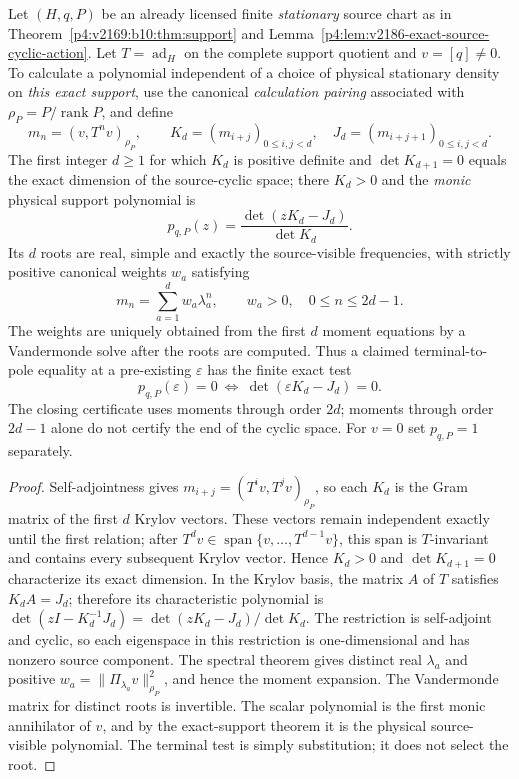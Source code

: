 \documentclass[12pt,a4paper]{article}
\begin{document}
\begin{theorem}
\label{p4:thm:v2188-moment-pencil}
Let $(H,q,P)$ be an already licensed finite \emph{stationary} source chart
as in Theorem~\ref{p4:v2169:b10:thm:support} and
Lemma~\ref{p4:lem:v2186-exact-source-cyclic-action}. Let
$T=\operatorname{ad}_H$ on the complete support quotient and
$v=[q]\ne0$. To calculate a polynomial independent of a choice of
physical stationary density on \emph{this exact support}, use the
canonical \emph{calculation pairing} associated with
$\rho_P=P/\operatorname{rank}P$, and define
\[
 m_n=(v,T^n v)_{\rho_P},\qquad
 K_d=(m_{i+j})_{0\le i,j<d},\quad
 J_d=(m_{i+j+1})_{0\le i,j<d}.
\]
The first integer $d\ge1$ for which $K_d$ is positive definite and
$\det K_{d+1}=0$ equals the exact dimension of the source-cyclic space;
there $K_d>0$ and the \emph{monic} physical support polynomial is
\[
 \boxed{p_{q,P}(z)=\frac{\det(zK_d-J_d)}{\det K_d}.}
\]
Its $d$ roots are real, simple and exactly the source-visible frequencies,
with strictly positive canonical weights $w_a$ satisfying
\[
 \boxed{m_n=\sum_{a=1}^{d} w_a\lambda_a^n,\qquad
 w_a>0,\quad 0\le n\le 2d-1.}
\]
The weights are uniquely obtained from the first $d$ moment equations
by a Vandermonde solve after the roots are computed. Thus a claimed
terminal-to-pole equality at a pre-existing $\varepsilon$ has the
finite exact test
\[
 \boxed{p_{q,P}(\varepsilon)=0
 \ \Longleftrightarrow\ \det(\varepsilon K_d-J_d)=0.}
\]
The closing certificate uses moments through order $2d$; moments
through order $2d-1$ alone do not certify the end of the cyclic space.
For $v=0$ set $p_{q,P}=1$ separately.
\end{theorem}
\begin{proof}
Self-adjointness gives
$m_{i+j}=(T^i v,T^j v)_{\rho_P}$, so each $K_d$ is the
Gram matrix of the first $d$ Krylov vectors. These vectors remain
independent exactly until the first relation; after
$T^d v\in\operatorname{span}\{v,\ldots,T^{d-1}v\}$,
this span is $T$-invariant and contains every subsequent Krylov vector.
Hence $K_d>0$ and $\det K_{d+1}=0$ characterize its exact dimension.
In the Krylov basis, the matrix $A$ of $T$ satisfies $K_dA=J_d$;
therefore its characteristic polynomial is
$\det(zI-K_d^{-1}J_d)=\det(zK_d-J_d)/\det K_d$.
The restriction is self-adjoint and cyclic, so each eigenspace in this
restriction is one-dimensional and has nonzero source component.
The spectral theorem gives distinct real $\lambda_a$ and positive
$w_a=\|\Pi_{\lambda_a}v\|_{\rho_P}^2$, and hence the moment expansion.
The Vandermonde matrix for distinct roots is invertible. The scalar
polynomial is the first monic annihilator of $v$, and by the exact-support
theorem it is the physical source-visible polynomial. The terminal test
is simply substitution; it does not select the root.
\end{proof}
\end{document}
